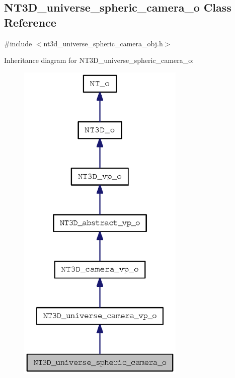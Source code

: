 \subsection{NT3D\_\-universe\_\-spheric\_\-camera\_\-o Class Reference}
\label{class_n_t3_d__universe__spheric__camera__o}


{\ttfamily \#include $<$nt3d\_\-universe\_\-spheric\_\-camera\_\-obj.h$>$}



Inheritance diagram for NT3D\_\-universe\_\-spheric\_\-camera\_\-o:
\nopagebreak
\begin{figure}[H]
\begin{center}
\leavevmode
\includegraphics[width=226pt]{class_n_t3_d__universe__spheric__camera__o__inherit__graph}
\end{center}
\end{figure}



